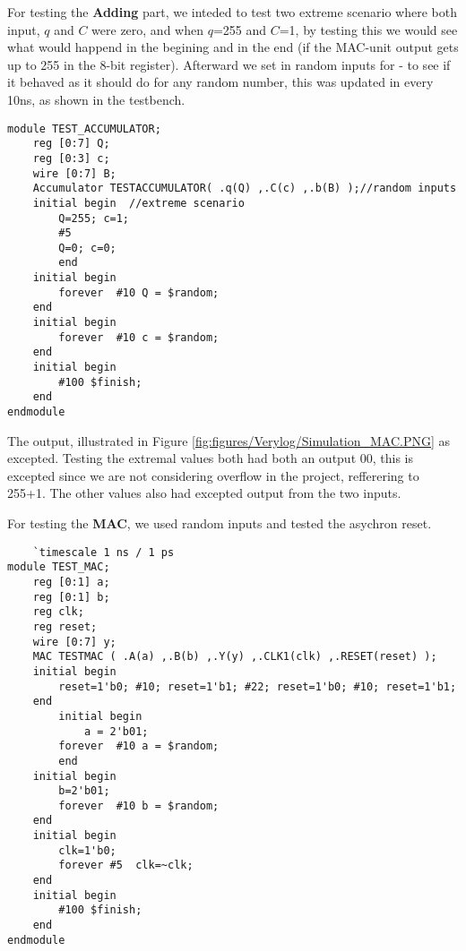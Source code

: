 For testing the \textbf{Adding} part, we inteded to test two extreme scenario where both input, $q$ and $C$ were zero, and when $q$=255 and $C$=1, by testing this we would see what would happend in the begining and in the end (if the MAC-unit output gets up to 255 in the 8-bit register). Afterward we set in random inputs for - to see if it behaved as it should do for any random number, this was updated in every 10ns, as shown in the testbench.

\begin{lstlisting}
module TEST_ACCUMULATOR;
	reg [0:7] Q;
	reg [0:3] c;
	wire [0:7] B;  
	Accumulator TESTACCUMULATOR( .q(Q) ,.C(c) ,.b(B) );//random inputs	  
	initial begin  //extreme scenario
		Q=255; c=1;
		#5
		Q=0; c=0;
		end
	initial begin 
  		forever	 #10 Q = $random;
	end	  
	initial begin
  		forever	 #10 c = $random;
	end	
	initial begin
		#100 $finish;
	end	  
endmodule	
\end{lstlisting}
The output, illustrated in Figure \ref{fig:figures/Verylog/Simulation_MAC.PNG} as excepted. Testing the extremal values both had both an output 00, this is excepted since we are not considering overflow in the project, refferering to 255+1. The other values also had excepted output from the two inputs. 

For testing the \textbf{MAC}, we used random inputs and tested the asychron reset.
\begin{lstlisting}
    `timescale 1 ns / 1 ps
module TEST_MAC;
	reg [0:1] a;
	reg [0:1] b;
	reg clk;
	reg reset;
	wire [0:7] y;
	MAC TESTMAC ( .A(a) ,.B(b) ,.Y(y) ,.CLK1(clk) ,.RESET(reset) );	
	initial begin
		reset=1'b0; #10; reset=1'b1; #22; reset=1'b0; #10; reset=1'b1;	
	end
		initial begin
			a = 2'b01;
  		forever	 #10 a = $random;
        end	  
	initial begin
		b=2'b01;
  		forever	 #10 b = $random;
	end	
	initial begin
		clk=1'b0;
		forever #5	clk=~clk;
	end	
	initial begin
		#100 $finish;
	end	
endmodule	
\end{lstlisting}


